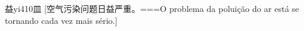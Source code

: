 \begin{EntryWithPhonetic}{益}{yi4}{10}{⽫}
  [空气污染问题日益严重。===O problema da poluição do ar está se tornando cada vez mais sério.]
\end{EntryWithPhonetic}
